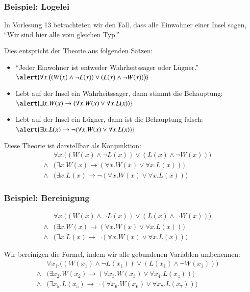 \documentclass[aspectratio=1610,onlymath]{beamer}
\begin{document}
\begin{frame}\frametitle{Beispiel: Logelei}

In Vorlesung 13 betrachteten wir den Fall, dass alle Einwohner einer Insel sagen,\\
"`Wir sind hier alle vom gleichen Typ."'\bigskip

Dies entspricht der Theorie aus folgenden Sätzen:
\begin{itemize}
\item "`Jeder Einwohner ist entweder Wahrheitssager oder Lügner."'\\
	$\alert{\forall x.\big((W(x)\wedge\neg L(x))\vee (L(x)\wedge\neg W(x))\big)}$
\item Lebt auf der Insel ein Wahrheitssager, dann stimmt die Behauptung:\\
	$\alert{\exists x.W(x)\to(\forall x.W(x) \vee \forall x.L(x))}$
\item Lebt auf der Insel ein Lügner, dann ist die Behauptung falsch:\\
	$\alert{\exists x.L(x)\to\neg(\forall x.W(x) \vee \forall x.L(x))}$
\end{itemize}\medskip\pause

Diese Theorie ist darstellbar als Konjunktion:
\begin{align*}
& \forall x.\big((W(x)\wedge\neg L(x))\vee (L(x)\wedge\neg W(x))\big)\\
{}\wedge{} & \big(\exists x.W(x)\to(\forall x.W(x) \vee \forall x.L(x))\big) \\
{}\wedge{} & \big(\exists x.L(x)\to\neg(\forall x.W(x) \vee \forall x.L(x))\big)
\end{align*}


\end{frame}

\begin{frame}\frametitle{Beispiel: Bereinigung}

\begin{align*}
& \forall x.\big((W(x)\wedge\neg L(x))\vee (L(x)\wedge\neg W(x))\big)\\
{}\wedge{} & \big(\exists x.W(x)\to(\forall x.W(x) \vee \forall x.L(x))\big) \\
{}\wedge{} & \big(\exists x.L(x)\to\neg(\forall x.W(x) \vee \forall x.L(x))\big)
\end{align*}\pause

Wir bereinigen die Formel, indem wir alle gebundenen Variablen umbenennen:
\begin{align*}
& \forall x_1.\big((W(x_1)\wedge\neg L(x_1))\vee (L(x_1)\wedge\neg W(x_1))\big)\\
{}\wedge{} & \big(\exists x_2.W(x_2)\to(\forall x_3.W(x_3) \vee \forall x_4.L(x_4))\big) \\
{}\wedge{} & \big(\exists x_5.L(x_5)\to\neg(\forall x_6.W(x_6) \vee \forall x_7.L(x_7))\big)
\end{align*}

\end{frame}
\end{document}
